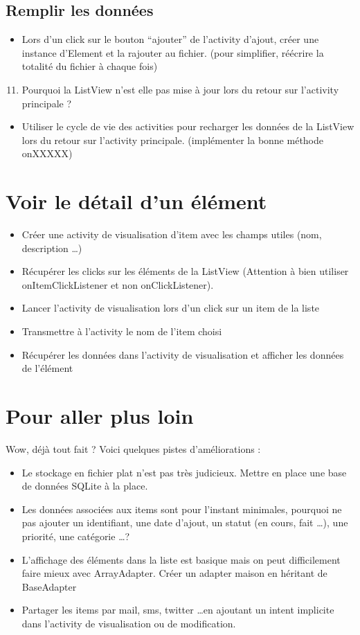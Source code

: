 \documentclass{article}
\begin{document}
 \subsection{Remplir les données}
 \begin{itemize}
  \item Lors d'un click sur le bouton ``ajouter'' de l'activity d'ajout, créer
  une instance d'Element et la rajouter au fichier. (pour simplifier, réécrire
  la totalité du fichier à chaque fois)
 \end{itemize}
  \begin{enumerate}
 \setcounter{enumi}{10}
\item Pourquoi la ListView n'est elle pas mise à jour lors du retour sur l'activity principale ?
\end{enumerate}
 \begin{itemize}
  \item Utiliser le cycle de vie des activities pour recharger les données de la ListView lors du retour sur l'activity principale. (implémenter la bonne méthode onXXXXX)
 \end{itemize}
 \section{Voir le détail d'un élément}
 \begin{itemize}
  \item Créer une activity de visualisation d'item avec les champs utiles (nom, description \ldots)
  \item Récupérer les clicks sur les éléments de la ListView (Attention à bien utiliser onItemClickListener et non onClickListener).
  \item Lancer l'activity de visualisation lors d'un click sur un item de la liste
  \item Transmettre à l'activity le nom de l'item choisi
  \item Récupérer les données dans l'activity de visualisation et afficher les
  données de l'élément
 \end{itemize}
 \section{Pour aller plus loin}
	Wow, déjà tout fait ? Voici quelques pistes d'améliorations :
  \begin{itemize}
  \item Le stockage en fichier plat n'est pas très judicieux. Mettre en place une base de données SQLite à la place.
  \item Les données associées aux items sont pour l'instant minimales, pourquoi ne pas ajouter un identifiant, une date d'ajout, un statut (en cours, fait \ldots), une priorité, une catégorie \ldots ?
  \item L'affichage des éléments dans la liste est basique mais on peut difficilement faire mieux avec ArrayAdapter. Créer un adapter maison en héritant de BaseAdapter
  \item Partager les items par mail, sms, twitter \ldots en ajoutant un intent implicite dans l'activity de visualisation ou de modification.
 \end{itemize}
\end{document}

